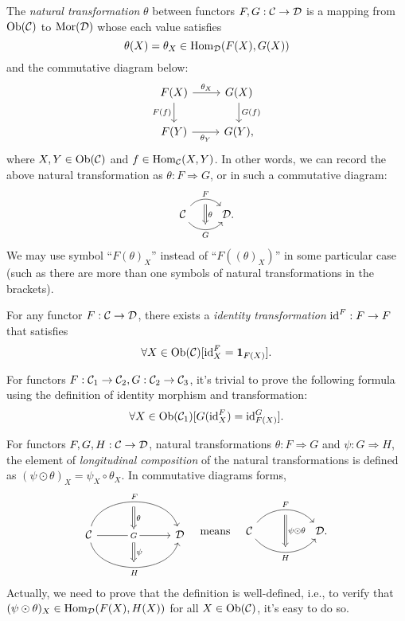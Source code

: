 \documentclass{article}
\begin{document}
\begin{defi}\label{natural transformation}
	The \emph{natural transformation} $\theta$ between functors $F,G:\mathcal{C}\to\mathcal{D}$ is a mapping from $\mathrm{Ob}(\mathcal{C})$ to $\mathrm{Mor}(\mathcal{D})$ whose each value satisfies
	\[\theta(X)=\theta_X\in\mathrm{Hom}_{\mathcal{D}}(F(X),G(X))\]
	and the commutative diagram below:
	\begin{equation}\begin{tikzcd}\label{ntr}
		F(X) \arrow[r,"\theta_X"] \arrow[d,"F(f)"'] & G(X) \arrow[d,"G(f)"]\\
		F(Y) \arrow[r,"\theta_Y"'] & G(Y),
	\end{tikzcd}\end{equation}
	where $X,Y\in\mathrm{Ob}(\mathcal{C})$ and $f\in\mathrm{Hom}_{\mathcal{C}}(X,Y)$. In other words, we can record the above natural transformation as $\theta:F\Rightarrow G$, or in such a commutative diagram:
	\[\begin{tikzcd}
			\C \arrow[r, "F", bend left=50, ""' name=F] \arrow[r, "G"', bend right=50, "" name=G] & \arrow[Rightarrow, from=F, to=G, "\theta"] \D.
		\end{tikzcd}\]
	We may use symbol ``$F(\theta)_X$'' instead of ``$F((\theta)_X)$'' in some particular case (such as there are more than one symbols of natural transformations in the brackets).

	For any functor $F:\mathcal{C}\to\mathcal{D}$, there exists a \emph{identity transformation} $\mathrm{id}^F:F\to F$ that satisfies
	 \[\forall X\in\mathrm{Ob}(\mathcal{C})[\mathrm{id}^F_X=\mathbf{1}_{F(X)}].\]
	
	For functors $F:\mathcal{C}_1\to\mathcal{C}_2,G:\mathcal{C}_2\to\mathcal{C}_3$, it's trivial to prove the following formula using the definition of identity morphism and transformation:
	\begin{equation}\label{id}
		\forall X\in\mathrm{Ob}(\mathcal{C}_1)[G(\mathrm{id}^F_X)=\mathrm{id}^G_{F(X)}].
	\end{equation}
\end{defi}


\begin{defi}\label{longitudinal composition}
	For functors $F,G,H:\mathcal{C}\to\mathcal{D}$, natural transformations $\theta:F\Rightarrow G$ and $\psi:G\Rightarrow H$, the element of \emph{longitudinal composition} of the natural transformations is defined as $(\psi\odot\theta)_X=\psi_X\circ\theta_X$. In commutative diagrams forms,
	\[\begin{tikzcd}
			& \arrow[d,Rightarrow,"\theta"] & \\
			\C \arrow[rr, "F", bend left=75] \arrow[rr, "H"', bend right=75] \arrow[rr, "G" description] &
			\textcolor{white}{s} \arrow[d,Rightarrow,"\psi"] &
			\D\\ & \quad &
		\end{tikzcd}\quad\text{means}\quad\begin{tikzcd}
			\C
			\arrow[bend left=50, rr, "F", ""' name=F]
			\arrow[bend right=50, rr, "H"', "" name=H] & & 
			\arrow[Rightarrow, from=F, to=H, "\psi\odot\theta"] \D.
		\end{tikzcd}\]
	Actually, we need to prove that the definition is well-defined, i.e., to verify that $(\psi\odot\theta)_X\in\mathrm{Hom}_{\mathcal{D}}(F(X),H(X))$ for all $X\in\mathrm{Ob}(\mathcal{C})$, it's easy to do so.
\end{defi}
\end{document}
